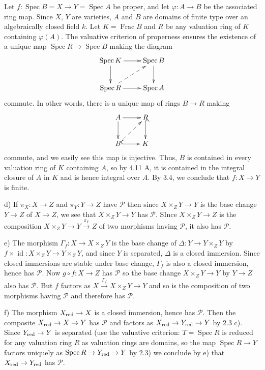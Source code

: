\documentclass{report}
\DeclareMathOperator{\id}{id}
\DeclareMathOperator{\Spec}{Spec}
\DeclareMathOperator{\Frac}{Frac}
\begin{document}
\bigskip
{}	Let $f:\Spec B=X\rightarrow Y=\Spec A$ be proper, and let $\varphi:A\rightarrow B$ be the associated ring map.
Since $X$, $Y$ are varieties, $A$ and $B$ are domains of finite type over an algebraically closed field $k$.
Let $K=\Frac B$ and $R$ be any valuation ring of $K$ containing $\varphi(A)$.
The valuative criterion of properness ensures the existence of a unique map $\Spec R\rightarrow \Spec B$
making the diagram
\begin{equation}
\xymatrix{
	\Spec K \ar[r] \ar[d] & \Spec B \ar[d] \\
	\Spec R \ar@{-->}[ur] \ar[r] & \Spec A
}\nonumber
\end{equation}
commute.	 
 In other words, there is a unique map of rings $B\rightarrow R$ making
\begin{equation}
\xymatrix{
	 A \ar[r] \ar[d] & R \ar@{^{(}->}[d] \\
	 B \ar@{-->}[ur] \ar@{^{(}->}[r] & K
}\nonumber
\end{equation} 
commute, and we easily see this map is injective.	Thus, $B$ is contained
in every valuation ring of $K$ containing $A$, so by 4.11 A, it is contained in the integral 
closure of $A$ in $K$ and is hence integral over $A$.  By 3.4, we conclude that $f:X\rightarrow Y$
is finite.  

\bigskip
{}	d)	If $\pi_X:X\rightarrow Z$ and $\pi_Y:Y\rightarrow Z$ have $\mathcal{P}$ then since $X\times_Z Y\rightarrow Y$
is the base change $Y\rightarrow Z$ of $X\rightarrow Z$, we see that $X\times_Z Y\rightarrow Y$ has $\mathcal{P}$.
SInce $X\times_Z Y\rightarrow Z$ is the composition $X\times_Z Y\rightarrow Y\xrightarrow{\pi_Y} Z$
of two morphisms having $\mathcal{P}$, it also has $\mathcal{P}$.
 
 \noindent
 e)	The morphism $\Gamma_f:X\rightarrow X\times_Z Y$ is the base change of $\Delta:Y\rightarrow Y\times_Z Y$
 by $f\times\id:X\times_Z Y\rightarrow Y\times_Z Y$, and since $Y$ is separated, $\Delta$ is a closed immersion.
 Since closed immersions are stable under base change, $\Gamma_f$ is also a closed immersion, hence has $\mathcal{P}$.
 Now $g\circ f:X\rightarrow Z$ has $\mathcal{P}$ so the base change $X\times_Z Y\rightarrow Y$ by $Y\rightarrow Z$ also has $\mathcal{P}$.
 But $f$ factors as $X\xrightarrow{\Gamma_f} X\times_Z Y\rightarrow Y$ and so is the composition of two morphisms
 having $\mathcal{P}$ and therefore has $\mathcal{P}$.
 
 \noindent
 f)	The morphism $X_{\rm red}\rightarrow X$ is a closed immersion, hence has $\mathcal{P}$.
 Then the composite $X_{\rm red}\rightarrow X\rightarrow Y$ 
 has $\mathcal{P}$ and factors as $X_{\rm red}\rightarrow Y_{\rm red}\rightarrow Y$ by 2.3 c).
 Since $Y_{\rm red}\rightarrow Y$ is separated (use the valuative criterion: $T=\Spec R$ is reduced for any valuation ring $R$
 as valuation rings are domains, so the map $\Spec R\rightarrow Y$ factors uniquely as $\Spec R\rightarrow Y_{\rm red}\rightarrow Y$
 by 2.3) 
 we conclude by e) that $X_{\rm red}\rightarrow Y_{\rm red}$
 has $\mathcal{P}$.
 
\end{document}
